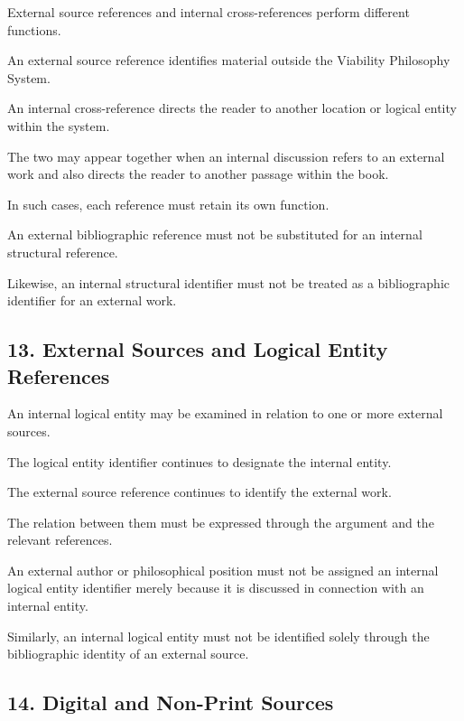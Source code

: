 External source references
and internal cross-references
perform different functions.

An external source reference
identifies material outside
the Viability Philosophy
System.

An internal cross-reference
directs the reader to another
location or logical entity
within the system.

The two may appear together
when an internal discussion
refers to an external work
and also directs the reader
to another passage within
the book.

In such cases, each reference
must retain its own function.

An external bibliographic
reference must not be
substituted for an internal
structural reference.

Likewise, an internal
structural identifier must
not be treated as a
bibliographic identifier
for an external work.


\subsection*{13. External Sources and
Logical Entity References}

An internal logical entity
may be examined in relation
to one or more external
sources.

The logical entity identifier
continues to designate
the internal entity.

The external source reference
continues to identify the
external work.

The relation between them
must be expressed through
the argument and the
relevant references.

An external author or
philosophical position
must not be assigned an
internal logical entity
identifier merely because
it is discussed in connection
with an internal entity.

Similarly, an internal
logical entity must not
be identified solely through
the bibliographic identity
of an external source.


\subsection*{14. Digital and Non-Print Sources}

